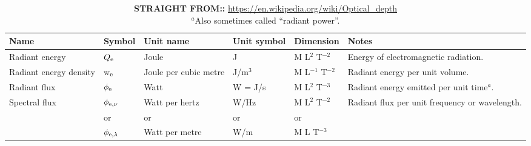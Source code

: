 \documentclass[11pt,a4paper]{article}
\begin{document}
\clearpage
\begin{landscape} 
\begin{table*}
  \begin{center}
    \setlength{\tabcolsep}{4pt}
    \begin{tabular}{  p{45mm}   p{20mm}  p{40mm}  p{20mm}   p{20mm}  p{90mm}} 
      \hline
      \hline
      Name	                                      & Symbol                       & Unit name                     & Unit symbol  & Dimension                 & Notes   \\
      \hline
      Radiant energy	                      &  $Q_{\rm e}$                 & Joule                              &	J             & M L$^{2}$    T$^{-2}$     & Energy of electromagnetic radiation. \\
      Radiant energy density            & w$_{\rm e}$	             & Joule per cubic metre    & J/m$^3$	      & M L$^{-1}$  T$^{-2}$     & Radiant energy per unit volume. \\
      Radiant flux                             & $\phi_{\rm e}$              & Watt	                              & W = J/s         & M L$^{2}$    T$^{-3}$    & Radiant energy emitted per unit time$^{a}$. \\
      \multirow{3}{*}{Spectral flux}  &  $\phi_{{\rm e}, \nu}$       & Watt per hertz                & W/Hz            & M L$^{2}$    T$^{−2}$    & Radiant flux per unit frequency or wavelength.  \\
                                                     &  or                                & or                                   & or                 & or                                & \\
                                                     & $\phi_{{\rm e}, \lambda}$  & Watt per metre                 & W/m            & M L             T$^{-3}$   & \\
      \hline
      \hline
    \end{tabular}
    \caption{{\bf STRAIGHT FROM::} 
      \href{https://en.wikipedia.org/wiki/Optical\_depth}{https://en.wikipedia.org/wiki/Optical\_depth}\\
      $^{a}$Also sometimes called ``radiant power''.
    }
     \label{tab:units_overview}
  \end{center}
\end{table*}
\end{landscape} 
\end{document}
